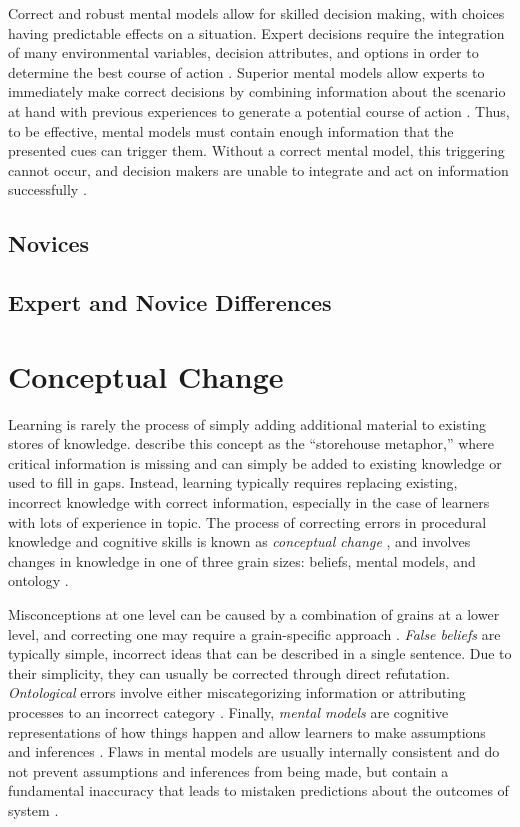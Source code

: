 Correct and robust mental models allow for skilled decision making, with choices having predictable effects on a situation. Expert decisions require the integration of many environmental variables, decision attributes, and options in order to determine the best course of action \citep{Klein2008}. Superior mental models allow experts to immediately make correct decisions \citep{Klein1992} by combining information about the scenario at hand with previous experiences to generate a potential course of action \citep{Klein1999}. Thus, to be effective, mental models must contain enough information that the presented cues can trigger them. Without a correct mental model, this triggering cannot occur, and decision makers are unable to integrate and act on information successfully \citep{Lipshitz1997}.

\subsection{Novices}


\subsection{Expert and Novice Differences}


\section{Conceptual Change}

Learning is rarely the process of simply adding additional material to existing stores of knowledge. \citet{Klein2006} describe this concept as the ``storehouse metaphor,'' where critical information is missing and can simply be added to existing knowledge or used to fill in gaps. Instead, learning typically requires replacing existing, incorrect knowledge with correct information, especially in the case of learners with lots of experience in topic. The process of correcting errors in procedural knowledge and cognitive skills is known as \emph{conceptual change} \citep{Chi2008}, and involves changes in knowledge in one of three grain sizes: beliefs, mental models, and ontology \citep{Gadgil2012}.

Misconceptions at one level can be caused by a combination of grains at a lower level, and correcting one may require a grain-specific approach \citep{Gadgil2012}. \emph{False beliefs} are typically simple, incorrect ideas that can be described in a single sentence. Due to their simplicity, they can usually be corrected through direct refutation. \emph{Ontological} errors involve either miscategorizing information or attributing processes to an incorrect category \citep{Chi1994}. Finally, \emph{mental models} are cognitive representations of how things happen \citep{Klein2006} and allow learners to make assumptions and inferences \citep{Gadgil2012}. Flaws in mental models are usually internally consistent and do not prevent assumptions and inferences from being made, but contain a fundamental inaccuracy that leads to mistaken predictions about the outcomes of system \citep{Vosniadou1994}.

